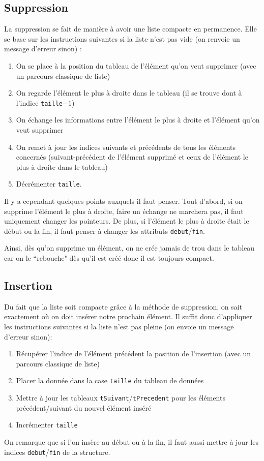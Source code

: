 \documentclass{report}
\newcommand{\code}{\lstinline[style=customjava]}
\begin{document}
      \subsection{Suppression}
        La suppression se fait de manière à avoir une liste compacte en permanence. Elle se base sur les instructions suivantes si la liste n'est pas vide (on renvoie un message d'erreur sinon) :
        \begin{enumerate}
          \item On se place à la position du tableau de l'élément qu'on veut supprimer (avec un parcours classique de liste)
          \item On regarde l'élément le plus à droite dans le tableau (il se trouve dont à l'indice \code{taille}$-1$)
          \item On échange les informations entre l'élément le plus à droite et l'élément qu'on veut supprimer
          \item On remet à jour les indices suivants et précédents de tous les éléments concernés (suivant-précédent de l'élément supprimé et ceux de l'élément le plus à droite dans le tableau)
          \item Décrémenter \code{taille}.
        \end{enumerate}
        Il y a cependant quelques points auxquels il faut penser.
        Tout d'abord, si on supprime l'élément le plus à droite, faire un échange ne marchera pas, il faut uniquement changer les pointeurs. De plus, si l'élément le plus à droite était le début ou la fin, il faut penser à changer les attributs \code{debut}/\code{fin}.
        
        Ainsi, dès qu'on supprime un élément, on ne crée jamais de trou dans le tableau car on le ``rebouche" dès qu'il est créé donc il est toujours compact.
      \subsection{Insertion}
        Du fait que la liste soit compacte grâce à la méthode de suppression, on sait exactement où on doit insérer notre prochain élément. Il suffit donc d'appliquer les instructions suivantes si la liste n'est pas pleine (on envoie un message d'erreur sinon): 
        \begin{enumerate}
          \item Récupérer l'indice de l'élément précédent la position de l'insertion (avec un parcours classique de liste)
          \item Placer la donnée dans la case \code{taille} du tableau de données
          \item Mettre à jour les tableaux \code{tSuivant}/\code{tPrecedent} pour les éléments précédent/suivant du nouvel élément inséré
          \item Incrémenter \code{taille}
        \end{enumerate}
        On remarque que si l'on insère au début ou à la fin, il faut aussi mettre à jour les indices \code{debut}/\code{fin} de la structure.
\end{document}

